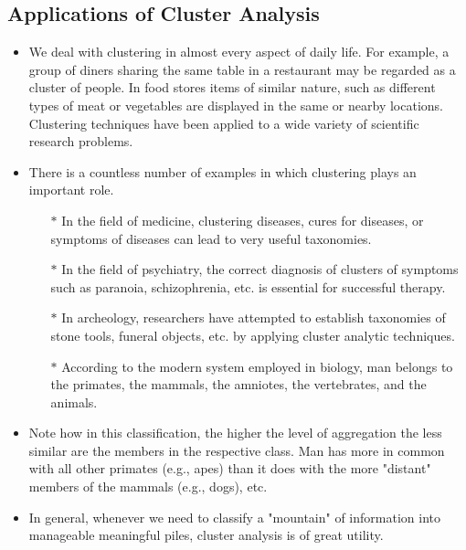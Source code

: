 \documentclass[a4paper,12pt]{article}
\begin{document}
\subsection{Applications of Cluster Analysis}
\begin{itemize}
\item 	
We deal with clustering in almost every aspect of daily life. For example, a group of diners sharing the same table in a restaurant may be regarded as a cluster of people. In food stores items of similar nature, such as different types of meat or vegetables are displayed in the same or nearby locations. Clustering techniques have been applied to a wide variety of scientific research problems. 

\item There is a countless number of examples in which clustering plays an important role. 
\begin{itemize}
\item[$\ast$] In the field of medicine, clustering diseases, cures for diseases, or symptoms of diseases can lead to very useful taxonomies. 
\item[$\ast$] In the field of psychiatry, the correct diagnosis of clusters of symptoms such as paranoia, schizophrenia, etc. is essential for successful therapy. 
\item[$\ast$] In archeology, researchers have attempted to establish taxonomies of stone tools, funeral objects, etc. by applying cluster analytic techniques. 
\item[$\ast$] According to the modern system employed in biology, man belongs to the primates, the mammals, the amniotes, the vertebrates, and the animals.
\end{itemize}
\item 
Note how in this classification, the higher the level of aggregation the less similar are the members in the respective class. Man has more in common with all other primates (e.g., apes) than it does with the more "distant" members of the mammals (e.g., dogs), etc.
\item 
In general, whenever we need to classify a "mountain" of information into manageable meaningful piles, cluster analysis is of great utility.
\end{itemize}

\end{document}
